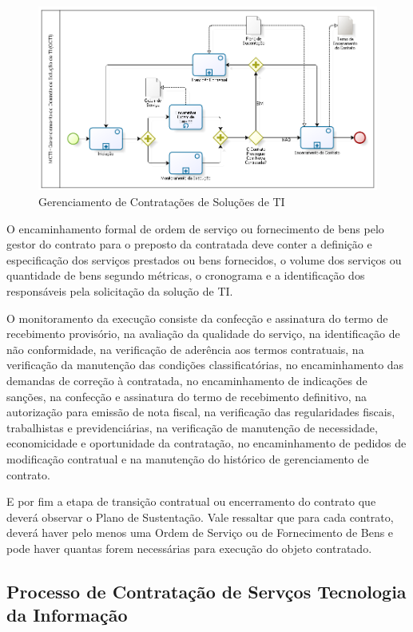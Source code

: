 \begin{figure}[h]
		\centering
		\label{fig05}
			\includegraphics[scale=0.6]{figuras/GCTI.png}
		\caption{Gerenciamento de Contratações de Soluções de TI   \cite{mcti}}
\end{figure}

O encaminhamento formal de ordem de serviço ou fornecimento de bens pelo gestor do contrato para o preposto da contratada deve conter a definição e especificação dos serviços prestados ou bens fornecidos, o volume dos serviços ou quantidade de bens segundo métricas, o cronograma e a identificação dos responsáveis pela solicitação da solução de TI. 

O monitoramento da execução consiste da confecção e assinatura do termo de recebimento provisório, na avaliação da qualidade do serviço, na identificação de não conformidade, na verificação de aderência aos termos contratuais, na verificação da manutenção das condições classificatórias, no encaminhamento das demandas de correção à contratada, no encaminhamento de indicações de sanções, na confecção e assinatura do termo de recebimento definitivo, na autorização para emissão de nota fiscal, na verificação das regularidades fiscais, trabalhistas e previdenciárias, na verificação de manutenção de necessidade, economicidade e oportunidade da contratação, no encaminhamento de pedidos de modificação contratual e na manutenção do histórico de gerenciamento de contrato. 

E por fim a etapa de transição contratual ou encerramento do contrato que deverá observar o Plano de Sustentação. Vale ressaltar que para cada contrato, deverá haver pelo menos uma Ordem de Serviço ou de Fornecimento de Bens e pode haver quantas forem necessárias para execução do objeto contratado.


\subsection[Processo de Contratação de Serviços Tecnologia da Informação]{Processo de Contratação de Servços Tecnologia da Informação}

